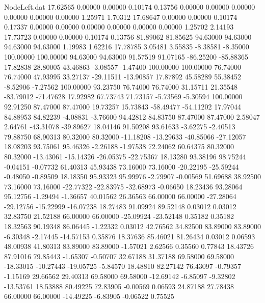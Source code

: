 \begin{filecontents}{NodeLeft.dat}
  17.62565    0.00000    0.00000     0.10174    0.13756    0.00000    0.00000    0.00000    0.00000    0.00000    0.00000    1.25971    1.70312
  17.68647    0.00000    0.00000     0.10174    0.17337    0.00000    0.00000    0.00000    0.00000    0.00000    0.00000    1.25702    2.14193
  17.73723    0.00000    0.00000     0.10174    0.13756   81.89062   81.85625   94.63000   94.63000   94.63000   94.63000    1.19983    1.62216
  17.78785    3.05481    3.55835    -8.38581   -8.35000  100.00000  100.00000   94.63000   94.63000   91.57519   91.07165  -86.25200  -85.88365
  17.82838   28.80005   43.46863    -3.08557   -1.47400  100.00000  100.00000   76.74000   76.74000   47.93995   33.27137  -29.11511  -13.90857
  17.87892   45.58289   55.38452    -8.52906   -7.27562  100.00000   93.23750   76.74000   76.74000   31.15711   21.35548  -83.79012  -71.47628
  17.92982   67.73743   71.73157    -5.73569   -5.30594  100.00000   92.91250   87.47000   87.47000   19.73257   15.73843  -58.49477  -54.11202
  17.97044   84.88953   84.82239    -4.08831   -3.76600   94.42812   84.83750   87.47000   87.47000    2.58047    2.64761  -43.31078  -39.89627
  18.04146   91.50208   93.61633    -3.62275   -2.40513   79.88750   68.90313   80.32000   80.32000  -11.18208  -13.29633  -40.85066  -27.12057
  18.08203   93.75061   95.46326    -2.26188   -1.97538   72.24062   60.64375   80.32000   80.32000  -13.43061  -15.14326  -26.05375  -22.75367
  18.13280   93.38196   98.75244    -0.04151   -0.07732   61.40313   45.93438   73.16000   73.16000  -20.22195  -25.59244   -0.48050   -0.89509
  18.18350   95.93323   95.99976    -2.79907   -0.00569   51.69688   38.92500   73.16000   73.16000  -22.77322  -22.83975  -32.68973   -0.06650
  18.23436   93.28064   95.12756    -1.29494   -1.36657   40.01562   26.36563   66.00000   66.00000  -27.28064  -29.12756  -15.22999  -16.07238
  18.27483   91.09924   89.52148     0.03012    0.03012   32.83750   21.52188   66.00000   66.00000  -25.09924  -23.52148    0.35182    0.35182
  18.32563   90.19348   86.06445    -1.22332    0.03012   42.76562   34.82500   83.89000   83.89000   -6.30348   -2.17445  -14.57153    0.35876
  18.37636   85.46021   81.26434     0.03012    0.06593   48.00938   41.80313   83.89000   83.89000   -1.57021    2.62566    0.35560    0.77843
  18.43726   87.91016   79.85443    -1.65307   -0.50707   32.67188   31.37188   69.58000   69.58000  -18.33015  -10.27443  -19.05725   -5.84570
  18.48810   82.27142   76.43097    -0.79357   -1.15169   29.66562   29.40313   69.58000   69.58000  -12.69142   -6.85097   -9.32802  -13.53761
  18.53888   80.49225   72.83905    -0.00569    0.06593   24.87188   27.78438   66.00000   66.00000  -14.49225   -6.83905   -0.06522    0.75525

\end{filecontents}
